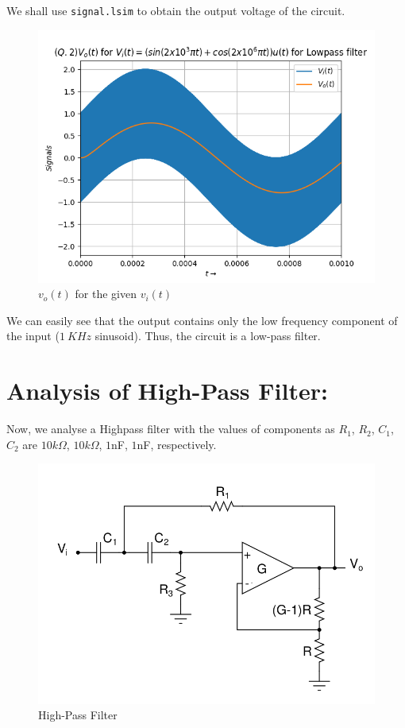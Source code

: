 \documentclass[11pt, a4paper]{article}
\begin{document}
    We shall use \texttt{signal.lsim} to obtain the output voltage of the circuit.
    \begin{figure}[H]
        \centering
        \includegraphics[scale=0.6]{Figure_2.png}
        \caption{$v_o(t)$ for the given $v_i(t)$}
        \label{fig:Fig2}
    \end{figure}
    
    We can easily see that the output contains only the low frequency component of the input ($1\ KHz$ sinusoid). Thus, the circuit is a low-pass filter. 
\section{Analysis of High-Pass Filter:}

Now, we analyse a Highpass filter with the values of components as $R_1$, $R_2$, $C_1$, $C_2$ are $10k\Omega$, $10k\Omega$, $1$nF, $1$nF, respectively.
\begin{figure}[H]
    \centering
    \includegraphics[scale=0.35]{hpf_ckt.png}
    \caption{High-Pass Filter}
    \label{fig:fig5}
\end{figure}
\end{document}
